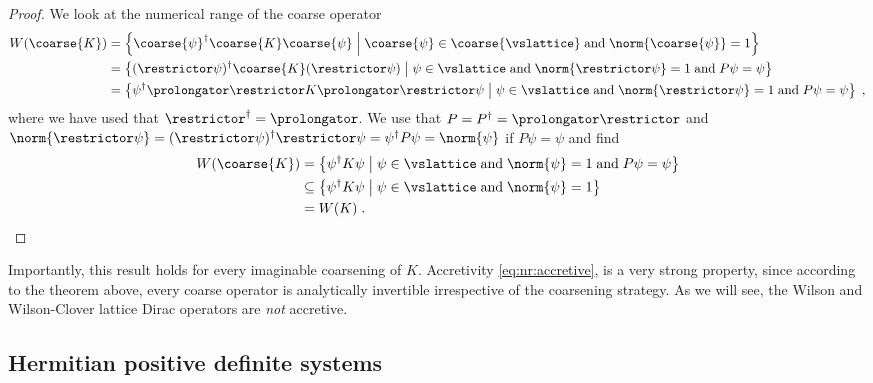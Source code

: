 \begin{proof}
We look at the numerical range of the coarse operator
\begin{align*}
W({\coarse{K}})
&= \left\{ \coarse{\psi}^\dagger \coarse{K} \coarse{\psi} \; \middle| \; \coarse{\psi} \in \coarse{\vslattice} \; \text{and} \; \norm{\coarse{\psi}} = 1 \right\} \\
&= \left\{ (\restrictor \psi)^\dagger \coarse{K} (\restrictor \psi) \; \middle| \; \psi \in \vslattice \; \text{and} \; \norm{\restrictor \psi} = 1 \; \text{and} \; P \psi = \psi \right\} \\
&= \left\{ \psi^\dagger \prolongator \restrictor K \prolongator \restrictor \psi \; \middle| \; \psi \in \vslattice \; \text{and} \; \norm{\restrictor \psi} = 1 \; \text{and} \; P \psi = \psi \right\} \;,
\end{align*}
where we have used that $\restrictor^\dagger = \prolongator$. We use that $P = P^\dagger = \prolongator \restrictor$ and $\norm{\restrictor \psi} = (\restrictor \psi)^\dagger \restrictor \psi = \psi^\dagger P \psi = \norm{\psi}$ if $P \psi = \psi$ and find
\begin{align*}
W({\coarse{K}})
&= \left\{ \psi^\dagger K \psi \; \middle| \; \psi \in \vslattice \; \text{and} \; \norm{\psi} = 1 \; \text{and} \; P \psi = \psi \right\} \\
&\subseteq \left\{ \psi^\dagger K \psi \; \middle| \; \psi \in \vslattice \; \text{and} \; \norm{\psi} = 1 \right\} \\
&= W({K}) \;.
\end{align*}
\end{proof}

Importantly, this result holds for every imaginable coarsening of $K$.
Accretivity \cref{eq:nr:accretive}, is a very strong property, since according to the theorem above, every coarse operator is analytically invertible irrespective of the coarsening strategy.
As we will see, the Wilson and Wilson-Clover lattice Dirac operators are \emph{not} accretive.

\subsection{Hermitian positive definite systems}

